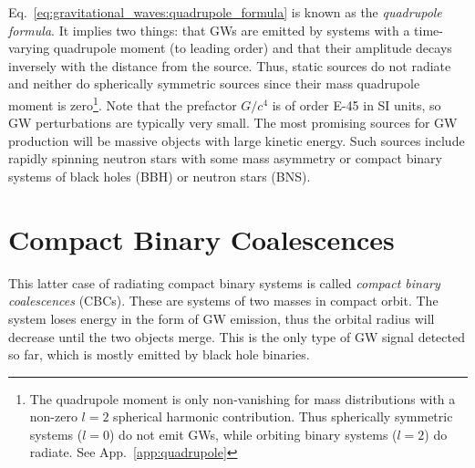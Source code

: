 Eq.~\ref{eq:gravitational_waves:quadrupole_formula} is known as the \emph{quadrupole formula}.
It implies two things: that GWs are emitted by systems with a time-varying quadrupole moment (to leading order) and that their amplitude decays inversely with the distance from the source. Thus, static sources do not radiate and neither do spherically symmetric sources since their mass quadrupole moment is zero\footnote{The quadrupole moment is only non-vanishing for mass distributions with a non-zero $l=2$ spherical harmonic contribution. Thus spherically symmetric systems ($l=0$) do not emit GWs, while orbiting binary systems ($l=2$) do radiate. See App.~\ref{app:quadrupole}}. Note that the prefactor $G/c^4$ is of order \SI{E-45}{} in SI units, so GW perturbations are typically very small. The most promising sources for GW production will be massive objects with large kinetic energy. Such sources include rapidly spinning neutron stars with some mass asymmetry or compact binary systems of black holes (BBH) or neutron stars (BNS). 

\section{Compact Binary Coalescences}

This latter case of radiating compact binary systems is called \emph{compact binary coalescences} (CBCs). These are systems of two masses in compact orbit. The system loses energy in the form of GW emission, thus the orbital radius will decrease until the two objects merge. This is the only type of GW signal detected so far, which is mostly emitted by black hole binaries. 

